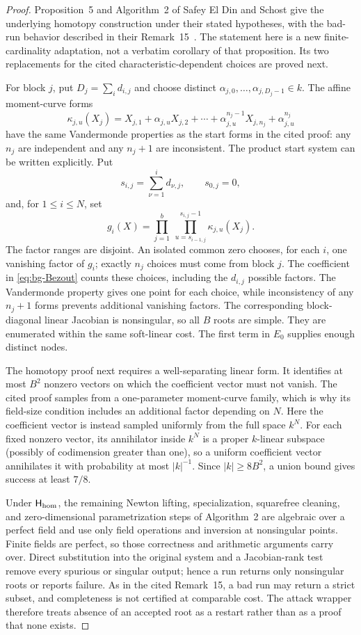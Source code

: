\documentclass[11pt]{article}
\begin{document}
\begin{proof}
Proposition~5 and Algorithm~2 of Safey El Din and Schost give the underlying
homotopy construction under their stated hypotheses, with the bad-run behavior
described in their Remark~15~\cite{SafeyElDinSchost2018}.
The statement here is a new finite-cardinality adaptation, not a verbatim
corollary of that proposition.  Its two replacements for the cited
characteristic-dependent choices are proved next.

For block $j$, put $D_j=\sum_i d_{i,j}$ and choose distinct
$\alpha_{j,0},\ldots,\alpha_{j,D_j-1}\in k$.  The affine moment-curve forms
\[
 \kappa_{j,u}(X_j)=X_{j,1}+\alpha_{j,u}X_{j,2}+
   \cdots+\alpha_{j,u}^{n_j-1}X_{j,n_j}+\alpha_{j,u}^{n_j}
\]
have the same Vandermonde properties as the start forms in the cited proof:
any $n_j$ are independent and any $n_j+1$ are inconsistent.  The product
start system can be written explicitly.  Put
\[
 s_{i,j}=\sum_{\nu=1}^i d_{\nu,j},\qquad s_{0,j}=0,
\]
and, for $1\le i\le N$, set
\[
 g_i(X)=
 \prod_{j=1}^b\ \prod_{u=s_{i-1,j}}^{s_{i,j}-1}
 \kappa_{j,u}(X_j).
\]
The factor ranges are disjoint.  An isolated common zero chooses, for each
$i$, one vanishing factor of $g_i$; exactly $n_j$ choices must come from
block $j$.  The coefficient in \eqref{eq:bg-Bezout} counts these choices,
including the $d_{i,j}$ possible factors.  The Vandermonde property gives one
point for each choice, while inconsistency of any $n_j+1$ forms prevents
additional vanishing factors.  The corresponding block-diagonal linear
Jacobian is nonsingular, so all $B$ roots are simple.  They are enumerated
within the same soft-linear cost.  The first term in $E_0$ supplies enough
distinct nodes.

The homotopy proof next requires a well-separating linear form.  It identifies
at most $B^2$ nonzero vectors on which the coefficient vector must not vanish.
The cited proof samples from a one-parameter moment-curve family, which is why
its field-size condition includes an additional factor depending on $N$.
Here the coefficient vector is instead sampled uniformly from the full space
$k^N$.  For each fixed nonzero vector, its annihilator inside $k^N$ is a proper
$k$-linear subspace (possibly of codimension greater than one), so a uniform
coefficient vector annihilates it with probability at most $|k|^{-1}$.  Since
$|k|\ge8B^2$, a union bound gives success at least $7/8$.

Under $\mathsf H_{\rm hom}$, the remaining Newton lifting, specialization, squarefree cleaning, and
zero-dimensional parametrization steps of Algorithm~2 are algebraic over a
perfect field and use only field operations and inversion at nonsingular
points.  Finite fields are perfect, so those correctness and arithmetic
arguments carry over.  Direct substitution into the original system and a
Jacobian-rank test remove every spurious or singular output; hence a run
returns only nonsingular roots or reports failure.  As in the cited
Remark~15, a bad run may return a strict subset, and completeness is not
certified at comparable cost.  The attack wrapper therefore treats absence of
an accepted root as a restart rather than as a proof that none exists.
\end{proof}
\end{document}

